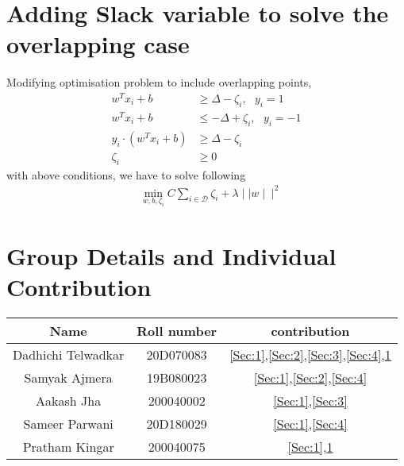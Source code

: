 \documentclass[11pt, twosides]{article}
\begin{document}
\section{Adding Slack variable to solve the overlapping case}
\label{Sec:5}
Modifying optimisation problem to include overlapping points,
\begin{align*}
    w^Tx_i + b &\ge \Delta - \zeta_i, \, \, \, \, y_i = 1\\
    w^Tx_i +b &\le -\Delta + \zeta_i,\, \, \, \, y_i = -1\\
        y_i \cdot \left(w^Tx_i + b \right) &\ge \Delta - \zeta_i \\
\zeta_i &\ge 0
\end{align*}
with above conditions, we have to solve following
\begin{align*}
    &\min_{w,b,\zeta_i} C\sum_{i \in \mathcal{D}} \zeta_i
 + \lambda \mid \mid w \mid \mid ^2 
 \end{align*}


\section{Group Details and Individual Contribution}
\begin{table}[H]
    \centering
    \begin{tabular}{|c|c|c|}
     \hline
        Name & Roll number & contribution \\
        \hline
        Dadhichi Telwadkar & 20D070083 & \ref{Sec:1},\ref{Sec:2},\ref{Sec:3},\ref{Sec:4},\ref{Sec:5}\\
        Samyak Ajmera & 19B080023 & \ref{Sec:1},\ref{Sec:2},\ref{Sec:4}\\
        Aakash Jha & 200040002 & \ref{Sec:1},\ref{Sec:3}\\
        Sameer Parwani & 20D180029 & \ref{Sec:1},\ref{Sec:4}\\
        Pratham Kingar & 200040075 & \ref{Sec:1},\ref{Sec:5}\\
    \hline
    \end{tabular}
    \label{tab:my_label}
\end{table}
\end{document}
